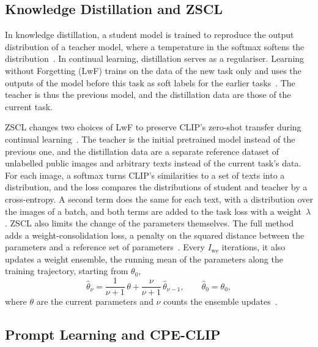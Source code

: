 \subsection{Knowledge Distillation and ZSCL}
\label{subsec:bg-zscl}

In knowledge distillation, a student model is trained to reproduce the output distribution of a teacher model, where a temperature in the softmax softens the distribution~\cite[Sec.~2]{hinton2015distilling}.
In continual learning, distillation serves as a regulariser.
Learning without Forgetting (LwF) trains on the data of the new task only and uses the outputs of the model before this task as soft labels for the earlier tasks~\cite{li2017learningforgetting}.
The teacher is thus the previous model, and the distillation data are those of the current task.

ZSCL changes two choices of LwF to preserve CLIP's zero-shot transfer during continual learning~\cite[Sec.~3.2, Eqs.~2--4]{zheng2023preventingzeroshottransferdegradation}.
The teacher is the initial pretrained model instead of the previous one, and the distillation data are a separate reference dataset of unlabelled public images and arbitrary texts instead of the current task's data.
For each image, a softmax turns CLIP's similarities to a set of texts into a distribution, and the loss compares the distributions of student and teacher by a cross-entropy.
A second term does the same for each text, with a distribution over the images of a batch, and both terms are added to the task loss with a weight~$\lambda$.
ZSCL also limits the change of the parameters themselves.
The full method adds a weight-consolidation loss, a penalty on the squared distance between the parameters and a reference set of parameters~\cite[Sec.~3.3, Eq.~5, Table~2]{zheng2023preventingzeroshottransferdegradation}.
Every $I_{\mathrm{we}}$ iterations, it also updates a weight ensemble, the running mean of the parameters along the training trajectory, starting from $\theta_0$,
\begin{equation}
\hat{\theta}_\nu = \frac{1}{\nu+1}\,\theta + \frac{\nu}{\nu+1}\,\hat{\theta}_{\nu-1}, \qquad \hat{\theta}_0 = \theta_0,
\label{eq:bg-we}
\end{equation}
where $\theta$ are the current parameters and $\nu$ counts the ensemble updates~\cite[Sec.~3.3, Eq.~7]{zheng2023preventingzeroshottransferdegradation}.

\subsection{Prompt Learning and CPE-CLIP}
\label{subsec:bg-prompt}

